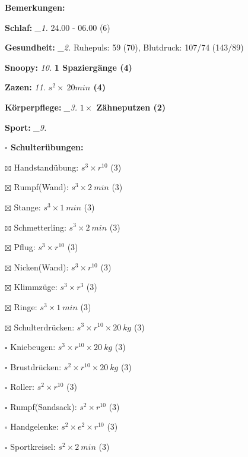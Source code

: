 \documentclass[10pt,a4paper]{article}
\newcommand\prop[1] {{\color {alizarin} {\bf #1}}}             %
\newcommand\draf[1] {{\color {amber(sae/ece)} {\bf #1}}}       %
\newcommand\mand[1] {{\color {burntorange} {\bf #1}}}          %
\newcommand\topspace{\vskip -15pt \hskip 20pt}
\newcommand\n[1] { {\sl #1.} \hskip 5pt }
\begin{document}
\begin{mdframed}[style=daystyle]
  \begin{labeling}{{\mand {Bemerkungen:}}}
    \setlength\itemsep{-3pt}
  \item[{\mand {Schlaf:}}]        \n{\_1} 24.00 - 06.00 (6)
  \item[{\mand {Gesundheit:}}]    \n{\_2} Ruhepuls: 59 (70), Blutdruck: 107/74 (143/89)
  \item[{\mand {Snoopy:}}]         \n{10} {\draf {1 Spaziergänge (4)}}    
  \item[{\mand {Zazen:}}]          \n{11} {\draf {$s^2 \times\ 20 min$ (4)}}
  \item[{\mand {Körperpflege:}}]  \n{\_3} {\draf {$1 \times$ Zähneputzen (2)}}
  \item[{\mand {Sport:}}]         \n{\_9}
    \topspace
    \begin{minipage}{0.75\textwidth}  
      \begin{labeling}{\prop {$\square$ {Schulterübungen:}}} 
        \setlength\itemsep{-3pt}
      \item[$\boxtimes$ Handstandübung:]  $s^3 \times r^{10}$ (3)
      \item[$\boxtimes$ Rumpf(Wand):]     $s^3 \times 2\ min$ (3)
      \item[$\boxtimes$ Stange:]          $s^3 \times 1\ min$ (3)
      \item[$\boxtimes$ Schmetterling:]   $s^3 \times 2\ min$ (3)
      \item[$\boxtimes$ Pflug:]           $s^3 \times r^{10}$ (3)
      \item[$\boxtimes$ Nicken(Wand):]    $s^3 \times r^{10}$ (3)
      \item[$\boxtimes$ Klimmzüge:]       $s^3 \times r^3$ (3)
      \item[$\boxtimes$ Ringe:]           $s^3 \times 1\ min$ (3)
      \item[$\boxtimes$ Schulterdrücken:] $s^3 \times r^{10} \times 20\ kg$ (3)
      \item[$\square$ Kniebeugen:]      $s^3 \times r^{10} \times 20\ kg$ (3)
      \item[$\square$ Brustdrücken:]    $s^2 \times r^{10} \times 20\ kg$ (3)
      \item[$\square$ Roller:]          $s^2 \times r^{10}$ (3)
      \item[$\square$ Rumpf(Sandsack):] $s^2 \times r^{10}$ (3)
      \item[$\square$ Handgelenke:]     $s^2 \times e^2 \times r^{10}$ (3)
      \item[$\square$ Sportkreisel:]    $s^2 \times 2\ min$ (3)

\end{labeling}
\end{minipage}
\end{labeling}
\end{mdframed}
\end{document}
